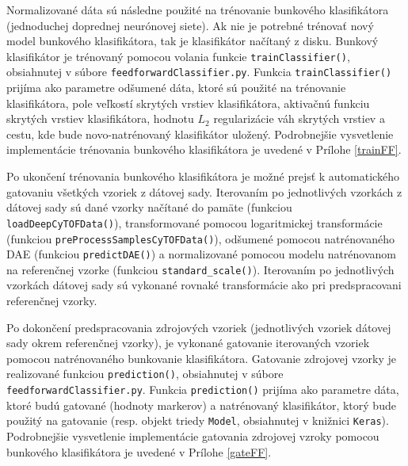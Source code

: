 \begin{sloppypar}
Normalizované dáta sú následne použité na trénovanie bunkového klasifikátora (jednoduchej doprednej neurónovej siete). Ak nie je potrebné trénovať nový model bunkového klasifikátora, tak je klasifikátor načítaný z disku. Bunkový klasifikátor je trénovaný pomocou volania funkcie \texttt{trainClassifier()}, obsiahnutej v súbore \texttt{feedforwardClassifier.py}. Funkcia \texttt{trainClassifier()} prijíma ako parametre odšumené dáta, ktoré sú použité na trénovanie klasifikátora, pole veľkostí skrytých vrstiev klasifikátora, aktivačnú funkciu skrytých vrstiev klasifikátora, hodnotu $L_2$ regularizácie váh skrytých vrstiev a cestu, kde bude novo-natrénovaný klasifikátor uložený. Podrobnejšie vysvetlenie implementácie trénovania bunkového klasifikátora je uvedené v Prílohe \ref{trainFF}.
\end{sloppypar}

\begin{sloppypar}
Po ukončení trénovania bunkového klasifikátora je možné prejsť k automatického gatovaniu všetkých vzoriek z dátovej sady. Iterovaním po jednotlivých vzorkách z dátovej sady sú dané vzorky načítané do pamäte (funkciou \texttt{loadDeepCyTOFData()}), transformované pomocou logaritmickej transformácie (funkciou \texttt{preProcessSamplesCyTOFData()}), odšumené pomocou natrénovaného DAE (funkciou \texttt{predictDAE()}) a normalizované pomocou modelu natrénovanom na referenčnej vzorke (funkciou \texttt{standard_scale()}). Iterovaním po jednotlivých vzorkách dátovej sady sú vykonané rovnaké transformácie ako pri predspracovani referenčnej vzorky. 
\end{sloppypar}

\begin{sloppypar}
Po dokončení predspracovania zdrojových vzoriek (jednotlivých vzoriek dátovej sady okrem referenčnej vzorky), je vykonané gatovanie iterovaných vzoriek pomocou natrénovaného bunkovanie klasifikátora. Gatovanie zdrojovej vzorky je realizované funkciou \texttt{prediction()}, obsiahnutej v súbore \texttt{feedforwardClassifier.py}. Funkcia \texttt{prediction()} prijíma ako parametre dáta, ktoré budú gatované (hodnoty markerov) a natrénovaný klasifikátor, ktorý bude použitý na gatovanie (resp. objekt triedy \texttt{Model}, obsiahnutej v knižnici \texttt{Keras}). Podrobnejšie vysvetlenie implementácie gatovania zdrojovej vzroky pomocou bunkového klasifikátora je uvedené v Prílohe \ref{gateFF}.
\end{sloppypar}

